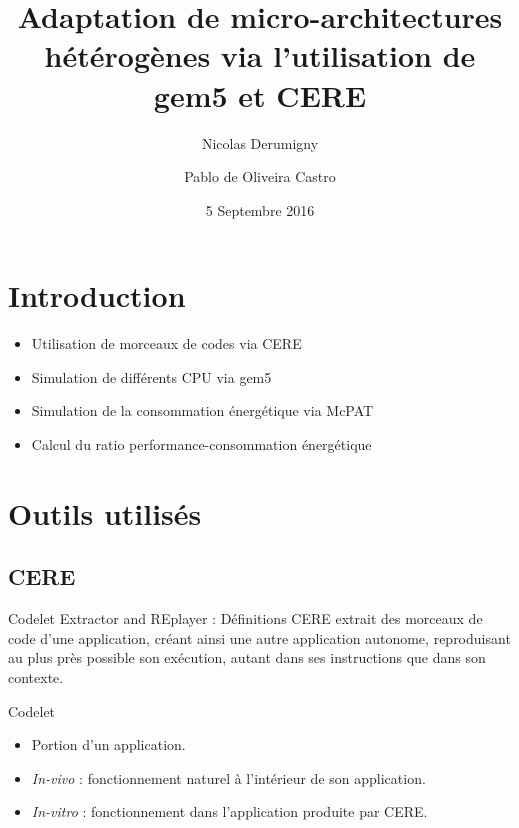 \documentclass{beamer}
\title[Adaptation de micro-architectures hétérogènes]{Adaptation de micro-architectures hétérogènes via l'utilisation de gem5 et CERE}
\author[N. Derumigny et P.De Oliveira]{Nicolas Derumigny \and Pablo de Oliveira Castro}
\institute[]{ENS Lyon \hspace*{8em} UVSQ \hspace*{3em}}
\date{5 Septembre 2016}
\begin{document}
\begin{frame}
	\titlepage
	\begin{center}
	\end{center}
\end{frame}




\section{Introduction}
\begin{frame}
\begin{itemize}
\item Utilisation de morceaux de codes via CERE\cite{CERE}
\bigskip
\item Simulation de différents CPU via gem5\cite{gem5-sim}
\bigskip
\item Simulation de la consommation énergétique via McPAT\cite{McPAT}
\bigskip
\item Calcul du ratio performance-consommation énergétique
\end{itemize}
\end{frame}

\section{Outils utilisés}
\subsection{CERE}
\begin{frame}{Codelet Extractor and REplayer : Définitions}
CERE extrait des morceaux de code d'une application, créant ainsi une autre application autonome, reproduisant au plus près possible son exécution, autant dans ses instructions que dans son contexte.

\begin{block}{Codelet}
\begin{itemize}
\item Portion d'un application. 
\item \textit{In-vivo} : fonctionnement naturel à l'intérieur de son application.
\item \textit{In-vitro} : fonctionnement dans l'application produite par CERE.
\end{itemize}
\end{block}
\end{frame}
\end{document}
